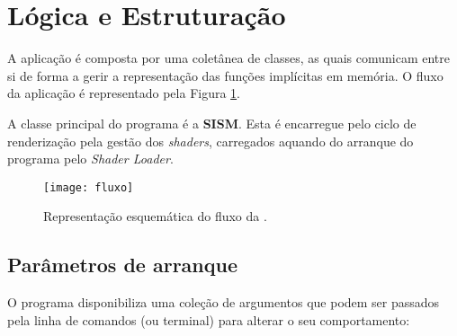 \section{Lógica e Estruturação}
\label{sec::impl:estrutura}

A aplicação é composta por uma coletânea de classes, as quais comunicam entre si de forma a gerir a representação das funções implícitas em memória. O fluxo da aplicação é representado pela Figura \ref{fig::fluxo}.

A classe principal do programa é a \textbf{\ac{SISM}}. Esta é encarregue pelo ciclo de renderização pela gestão dos \textit{shaders}, carregados aquando do arranque do programa pelo \textit{Shader Loader}.

\begin{figure}[!p]
	\centering
	\texttt{[image: fluxo]}
	\caption[Fluxo de execução da \theapp]{Representação esquemática do fluxo da \theapp.}
	\label{fig::fluxo}
\end{figure}



\subsection{Parâmetros de arranque}
\label{ssec::impl:estrutura:start}

O programa disponibiliza uma coleção de argumentos que podem ser passados pela linha de comandos (ou terminal) para alterar o seu comportamento:

